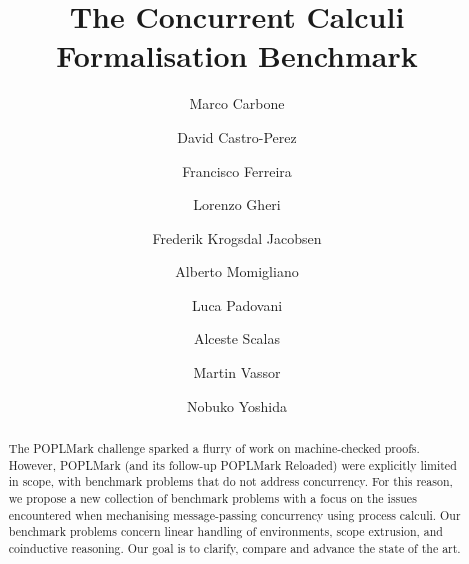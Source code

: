 \documentclass[runningheads]{llncs}
\begin{document}
\title{The Concurrent Calculi Formalisation Benchmark}

\author{
     Marco Carbone 
\and David Castro-Perez 
\and Francisco Ferreira 
\and Lorenzo Gheri 
\and Frederik Krogsdal Jacobsen 
\and Alberto Momigliano 
\and Luca Padovani 
\and Alceste Scalas 
\and Martin Vassor 
\and Nobuko Yoshida 
}



\maketitle

\begin{abstract}
  The POPLMark challenge sparked a flurry of work on machine-checked proofs.
  However, POPLMark (and its follow-up POPLMark Reloaded) were explicitly limited in scope,
  with benchmark problems that do not address concurrency. For this reason, we propose a new collection of benchmark problems with a focus on the issues encountered when mechanising message-passing concurrency using process calculi.
  Our benchmark problems concern linear handling of environments, scope extrusion, and coinductive reasoning.
  Our goal is to clarify, compare and advance the state of the art.

\end{abstract}
\end{document}
